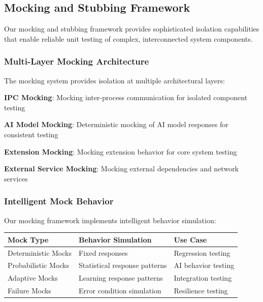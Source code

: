 \subsection*{Mocking and Stubbing Framework}

Our mocking and stubbing framework provides sophisticated isolation capabilities that enable reliable unit testing of complex, interconnected system components.

\subsubsection*{Multi-Layer Mocking Architecture}

The mocking system provides isolation at multiple architectural layers:

\begin{expandedlist}
    \item \textbf{IPC Mocking}: Mocking inter-process communication for isolated component testing
    \item \textbf{AI Model Mocking}: Deterministic mocking of AI model responses for consistent testing
    \item \textbf{Extension Mocking}: Mocking extension behavior for core system testing
    \item \textbf{External Service Mocking}: Mocking external dependencies and network services
\end{expandedlist}

\subsubsection*{Intelligent Mock Behavior}

Our mocking framework implements intelligent behavior simulation:

\begin{center}
\begin{tabular}{@{}lll@{}}
\toprule
\textbf{Mock Type} & \textbf{Behavior Simulation} & \textbf{Use Case} \\
\midrule
Deterministic Mocks & Fixed responses & Regression testing \\
Probabilistic Mocks & Statistical response patterns & AI behavior testing \\
Adaptive Mocks & Learning response patterns & Integration testing \\
Failure Mocks & Error condition simulation & Resilience testing \\
\bottomrule
\end{tabular}
\end{center}

